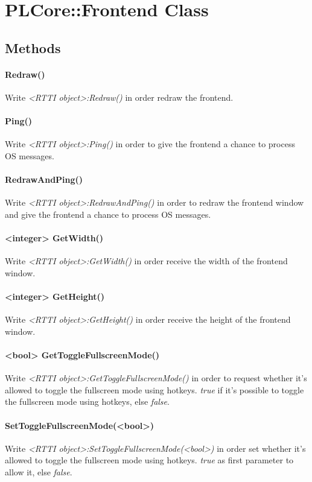 \section{PLCore::Frontend Class}


\subsection{Methods}

\paragraph{Redraw()}
Write \emph{<RTTI object>:Redraw()} in order redraw the frontend.

\paragraph{Ping()}
Write \emph{<RTTI object>:Ping()} in order to give the frontend a chance to process OS messages.

\paragraph{RedrawAndPing()}
Write \emph{<RTTI object>:RedrawAndPing()} in order to redraw the frontend window and give the frontend a chance to process OS messages.

\paragraph{<integer> GetWidth()}
Write \emph{<RTTI object>:GetWidth()} in order receive the width of the frontend window.

\paragraph{<integer> GetHeight()}
Write \emph{<RTTI object>:GetHeight()} in order receive the height of the frontend window.

\paragraph{<bool> GetToggleFullscreenMode()}
Write \emph{<RTTI object>:GetToggleFullscreenMode()} in order to request whether it's allowed to toggle the fullscreen mode using hotkeys. \emph{true} if it's possible to toggle the fullscreen mode using hotkeys, else \emph{false}.

\paragraph{SetToggleFullscreenMode(<bool>)}
Write \emph{<RTTI object>:SetToggleFullscreenMode(<bool>)} in order set whether it's allowed to toggle the fullscreen mode using hotkeys. \emph{true} as first parameter to allow it, else \emph{false}.

